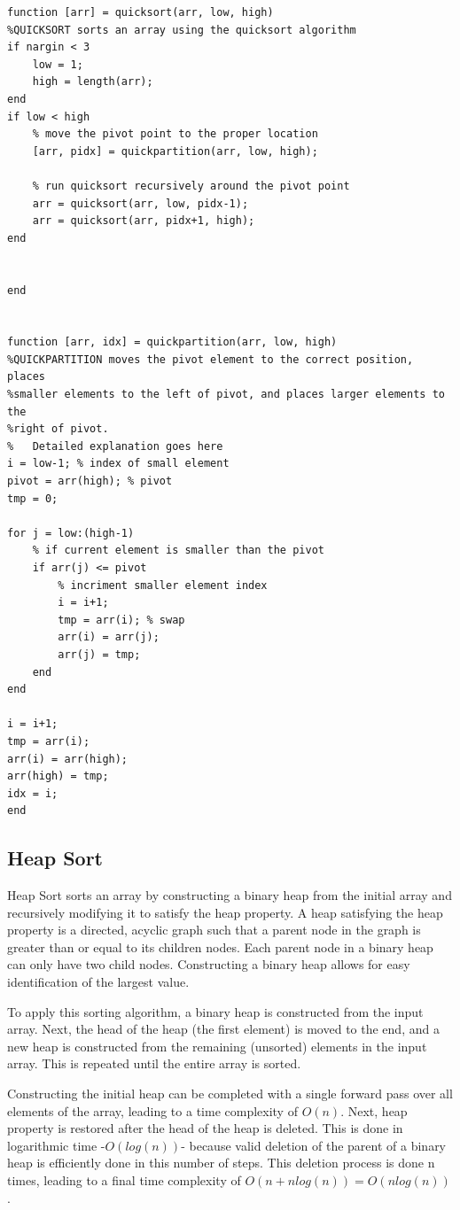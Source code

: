 \documentclass[a4paper]{article}
\begin{document}
\begin{lstlisting}
function [arr] = quicksort(arr, low, high)
%QUICKSORT sorts an array using the quicksort algorithm
if nargin < 3
    low = 1;
    high = length(arr);
end
if low < high
    % move the pivot point to the proper location
    [arr, pidx] = quickpartition(arr, low, high);
    
    % run quicksort recursively around the pivot point
    arr = quicksort(arr, low, pidx-1);
    arr = quicksort(arr, pidx+1, high);
end


end


function [arr, idx] = quickpartition(arr, low, high)
%QUICKPARTITION moves the pivot element to the correct position, places
%smaller elements to the left of pivot, and places larger elements to the
%right of pivot.
%   Detailed explanation goes here
i = low-1; % index of small element
pivot = arr(high); % pivot
tmp = 0;

for j = low:(high-1)
    % if current element is smaller than the pivot
    if arr(j) <= pivot
        % incriment smaller element index
        i = i+1;
        tmp = arr(i); % swap
        arr(i) = arr(j);
        arr(j) = tmp;
    end
end

i = i+1;
tmp = arr(i);
arr(i) = arr(high);
arr(high) = tmp;
idx = i;
end
\end{lstlisting}

\subsection{Heap Sort}
Heap Sort sorts an array by constructing a binary heap from the initial array and recursively modifying it to satisfy the heap property. A heap satisfying the heap property is a directed, acyclic graph such that a parent node in the graph is greater than or equal to its children nodes. Each parent node in a binary heap can only have two child nodes. Constructing a binary heap allows for easy identification of the largest value.

To apply this sorting algorithm, a binary heap is constructed from the input array. Next, the head of the heap (the first element) is moved to the end, and a new heap is constructed from the remaining (unsorted) elements in the input array. This is repeated until the entire array is sorted. 

Constructing the initial heap can be completed with a single forward pass over all elements of the array, leading to a time complexity of $O(n)$. Next, heap property is restored after the head of the heap is deleted. This is done in logarithmic time -$O(log(n))$- because valid deletion of the parent of a binary heap is efficiently done in this number of steps. This deletion process is done n times, leading to a final time complexity of $O(n + nlog(n)) = O(nlog(n))$. 
\end{document}
